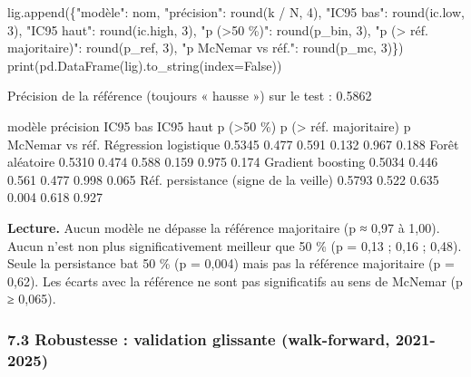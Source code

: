 \documentclass[
  10pt,
]{article}
\newenvironment{Shaded}{}{}
\newcommand{\BuiltInTok}[1]{\textcolor[rgb]{0.00,0.50,0.00}{#1}}
\newcommand{\DecValTok}[1]{\textcolor[rgb]{0.25,0.63,0.44}{#1}}
\newcommand{\NormalTok}[1]{#1}
\newcommand{\OperatorTok}[1]{\textcolor[rgb]{0.40,0.40,0.40}{#1}}
\newcommand{\StringTok}[1]{\textcolor[rgb]{0.25,0.44,0.63}{#1}}
\newcommand{\VariableTok}[1]{\textcolor[rgb]{0.10,0.09,0.49}{#1}}
\begin{document}
\begin{Shaded}
\begin{Highlighting}[]
\NormalTok{    lig.append(\{}\StringTok{"modèle"}\NormalTok{: nom, }\StringTok{"précision"}\NormalTok{: }\BuiltInTok{round}\NormalTok{(k }\OperatorTok{/}\NormalTok{ N, }\DecValTok{4}\NormalTok{), }\StringTok{"IC95 bas"}\NormalTok{: }\BuiltInTok{round}\NormalTok{(ic.low, }\DecValTok{3}\NormalTok{), }\StringTok{"IC95 haut"}\NormalTok{: }\BuiltInTok{round}\NormalTok{(ic.high, }\DecValTok{3}\NormalTok{),}
                \StringTok{"p (\textgreater{}50 \%)"}\NormalTok{: }\BuiltInTok{round}\NormalTok{(p\_bin, }\DecValTok{3}\NormalTok{), }\StringTok{"p (\textgreater{} réf. majoritaire)"}\NormalTok{: }\BuiltInTok{round}\NormalTok{(p\_ref, }\DecValTok{3}\NormalTok{), }\StringTok{"p McNemar vs réf."}\NormalTok{: }\BuiltInTok{round}\NormalTok{(p\_mc, }\DecValTok{3}\NormalTok{)\})}
\BuiltInTok{print}\NormalTok{(pd.DataFrame(lig).to\_string(index}\OperatorTok{=}\VariableTok{False}\NormalTok{))}
\end{Highlighting}
\end{Shaded}

\begin{Shaded}
\begin{Highlighting}[]
\NormalTok{Précision de la référence (toujours « hausse ») sur le test : 0.5862}

\NormalTok{                               modèle  précision  IC95 bas  IC95 haut  p (\textgreater{}50 \%)  p (\textgreater{} réf. majoritaire)  p McNemar vs réf.}
\NormalTok{                Régression logistique     0.5345     0.477      0.591      0.132                   0.967              0.188}
\NormalTok{                      Forêt aléatoire     0.5310     0.474      0.588      0.159                   0.975              0.174}
\NormalTok{                    Gradient boosting     0.5034     0.446      0.561      0.477                   0.998              0.065}
\NormalTok{Réf. persistance (signe de la veille)     0.5793     0.522      0.635      0.004                   0.618              0.927}
\end{Highlighting}
\end{Shaded}

\textbf{Lecture.} Aucun modèle ne dépasse la référence majoritaire (p ≈
0,97 à 1,00). Aucun n'est non plus significativement meilleur que 50 \%
(p = 0,13 ; 0,16 ; 0,48). Seule la persistance bat 50 \% (p = 0,004)
mais pas la référence majoritaire (p = 0,62). Les écarts avec la
référence ne sont pas significatifs au sens de McNemar (p ≥ 0,065).

\hypertarget{robustesse-validation-glissante-walk-forward-2021-2025}{%
\subsubsection{7.3 Robustesse : validation glissante (walk-forward,
2021-2025)}\label{robustesse-validation-glissante-walk-forward-2021-2025}}
\end{document}
